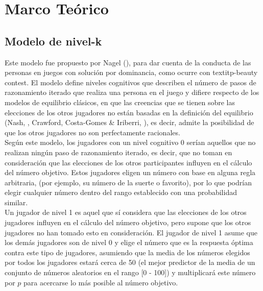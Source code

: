 \chapter{Marco Teórico} %

\label{Cap_SDT} %


\newcommand{\keyword}[1]{\textbf{#1}}
\newcommand{\tabhead}[1]{\textbf{#1}}
\newcommand{\code}[1]{\texttt{#1}}
\newcommand{\file}[1]{\texttt{\bfseries#1}}
\newcommand{\option}[1]{\texttt{\itshape#1}}


\section{Modelo de nivel-k}

Este modelo fue propuesto por Nagel (\citeyear{Nagel}), para dar cuenta de la conducta de las personas en juegos con solución por dominancia, como ocurre con textit{p-beauty contest}. El modelo define niveles cognitivos que describen el número de pasos de razonamiento iterado que realiza una persona en el juego y difiere respecto de los modelos de equilibrio clásicos, en que las creencias que se tienen sobre las elecciones de los otros jugadores no están basadas en la definición del equilibrio (Nash, \citeyear{Nash}, Crawford, Costa-Gomes & Iriberri, \citeyear{Crawford}), es decir, admite la posibilidad de que los otros jugadores no son perfectamente racionales.\\ 

Según este modelo, los jugadores con un nivel cognitivo 0 serían aquellos que no realizan ningún paso de razonamiento iterado, es decir, que no toman en consideración que las elecciones de los otros participantes influyen en el cálculo del número objetivo. Estos jugadores eligen un número con base en alguna regla arbitraria, (por ejemplo, su número de la suerte o favorito), por lo que podrían elegir cualquier número dentro del rango establecido con una probabilidad similar.\\

Un jugador de nivel 1 es aquel que sí considera que las elecciones de los otros jugadores influyen en el cálculo del número objetivo, pero supone que los otros jugadores no han tomado esto en consideración. El jugador de nivel 1 asume que los demás jugadores son de nivel 0 y elige el número que es la respuesta óptima contra este tipo de jugadores, asumiendo que la media de los números elegidos por todos los jugadores estará cerca de 50 (el mejor predictor de la media de un conjunto de números aleatorios en el rango [0 - 100]) y multiplicará este número por $p$ para acercarse lo más posible al número objetivo.\\

